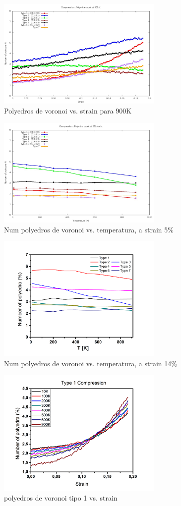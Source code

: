 \documentclass[10pt, oneside]{article} %
\begin{document}
\begin{figure}[H]
\centering
\includegraphics[width=8cm]{Figures/Compr_Polyedra_900K.jpeg}
\caption{Polyedros de voronoi vs. strain para 900K}
\end{figure}

\begin{figure}[H]
\centering
\includegraphics[width=8cm]{Figures/Compr_Voro_Temp_5.jpeg}
\caption{Num polyedros de voronoi vs. temperatura, a strain 5\%}
\end{figure}

\begin{figure}[H]
\centering
\includegraphics[width=8cm]{Figures/poly_T_14strain_COMP.png}
\caption{Num polyedros de voronoi vs. temperatura, a strain 14\%}
\end{figure}

\begin{figure}[H]
\centering
\includegraphics[width=8cm]{Figures/type1_COMP.png}
\caption{polyedros de voronoi tipo 1 vs. strain}
\end{figure}
\end{document}

